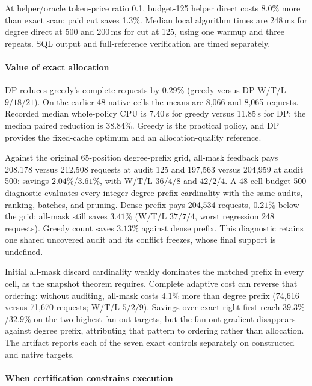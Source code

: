 At helper/oracle token-price ratio 0.1, budget-125 helper direct costs
8.0\% more than exact scan; paid cut saves 1.3\%. Median local algorithm
times are 248\,ms for degree direct at 500 and 200\,ms for cut at 125,
using one warmup and three repeats. SQL output and full-reference
verification are timed separately.



\paragraph*{Value of exact allocation}
DP reduces greedy's complete requests by $0.29\%$ (greedy versus DP
W/T/L $9/18/21$). On the earlier 48 native cells the means are 8,066 and
8,065 requests. Recorded median whole-policy CPU is 7.40\,s for greedy
versus 11.85\,s for DP; the median paired reduction is $38.84\%$.
Greedy is the practical policy, and DP provides the fixed-cache optimum
and an allocation-quality reference.

Against the original 65-position degree-prefix grid, all-mask feedback
pays 208,178 versus 212,508 requests at audit 125 and 197,563 versus
204,959 at audit 500: savings $2.04\%$/$3.61\%$, with W/T/L $36/4/8$
and $42/2/4$. A 48-cell budget-500 diagnostic evaluates every integer
degree-prefix cardinality with the same audits, ranking, batches, and
pruning. Dense prefix pays 204,534 requests, $0.21\%$ below the grid;
all-mask still saves $3.41\%$ (W/T/L $37/7/4$, worst regression 248
requests). Greedy count saves $3.13\%$ against dense prefix. This
diagnostic retains one shared uncovered audit and its conflict freezes,
whose final support is undefined.

Initial all-mask discard cardinality weakly dominates the matched prefix
in every cell, as the snapshot theorem requires. Complete adaptive cost
can reverse that ordering: without auditing, all-mask costs $4.1\%$ more
than degree prefix (74,616 versus 71,670 requests; W/T/L $5/2/9$).
Savings over exact right-first reach $39.3\%$/$32.9\%$ on the two
highest-fan-out targets, but the fan-out gradient disappears against
degree prefix, attributing that pattern to ordering rather than allocation.
The artifact reports each of the seven exact controls separately on constructed and native targets.

\paragraph*{When certification constrains execution}

